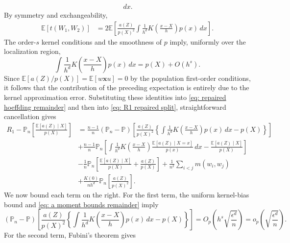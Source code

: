 \documentclass[11pt]{article}
\begin{document}
\begin{appendices}
\begin{align*}
    \,dx.
\end{align*}
By symmetry and exchangeability,
\begin{align*}
    \mathbb{E}[t(W_1,W_2)]
    &=
    2\mathbb{E}\left[
        \frac{a(Z)}{p(X)^2}
        \int
        \frac{1}{h^d}
        K\left(\frac{x-X}{h}\right)p(x)\,dx
    \right].
\end{align*}
The order-$s$ kernel conditions and the smoothness of $p$ imply, uniformly over the localization region,
\[
    \int
    \frac{1}{h^d}K\left(\frac{x-X}{h}\right)p(x)\,dx
    =
    p(X)+O(h^s).
\]
Since $\mathbb{E}[a(Z)/p(X)]=\mathbb{E}[w\boldsymbol{x}u]=0$ by the population first-order conditions, it follows that the contribution of the preceding expectation is entirely due to the kernel approximation error. Substituting these identities into \cref{eq: repaired hoeffding remainder} and then into \cref{eq: R1 repaired split}, straightforward cancellation gives
\begin{align}
    R_1
    -
    \mathbb{P}_n\left[
        \frac{\mathbb{E}[a(Z)\mid X]}{p(X)}
    \right]
    &=
    \frac{n-1}{n}(\mathbb{P}_n-\mathbb{P})
    \left[
        \frac{a(Z)}{p(X)^2}
        \left\{
            \int \frac{1}{h^d}
            K\left(\frac{x-X}{h}\right)p(x)\,dx
            -
            p(X)
        \right\}
    \right] \nonumber\\
    &
    +
    \frac{n-1}{n}\mathbb{P}_n
    \left[
        \int
        \frac{1}{h^d}
        K\left(\frac{x-X}{h}\right)
        \frac{\mathbb{E}[a(Z)\mid X=x]}{p(x)}
        \,dx
        -
        \frac{\mathbb{E}[a(Z)\mid X]}{p(X)}
    \right] \nonumber\\
    &
    -
    \frac{1}{n}\mathbb{P}_n
    \left[
        \frac{\mathbb{E}[a(Z)\mid X]}{p(X)}
        +
        \frac{a(Z)}{p(X)}
    \right]
    +
    \frac{1}{n^2}\sum_{i<j}m(w_i,w_j) \nonumber\\
    &
    +
    \frac{K(0)}{nh^d}
    \mathbb{P}_n\left[\frac{a(Z)}{p(X)^2}\right].
    \label{eq: repaired exact remainder decomposition}
\end{align}
We now bound each term on the right. For the first term, the uniform kernel-bias bound and
\cref{eq: a moment bounds remainder} imply
\[
    (\mathbb{P}_n-\mathbb{P})
    \left[
        \frac{a(Z)}{p(X)^2}
        \left\{
            \int \frac{1}{h^d}
            K\left(\frac{x-X}{h}\right)p(x)\,dx-p(X)
        \right\}
    \right]
    =
    O_p\left(h^s\sqrt{\frac{\epsilon^d}{n}}\right)
    =
    o_p\left(\sqrt{\frac{\epsilon^d}{n}}\right).
\]
For the second term, Fubini's theorem gives

\end{appendices}
\end{document}
